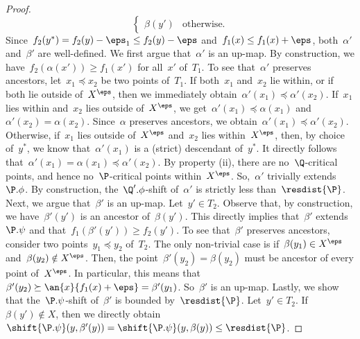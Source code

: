 \begin{proof}
\[\begin{cases}
            \beta(y') & \text{otherwise.}
        \end{cases}
    \]
    Since~$f_2(y^*) = f_2(y) - \eps_1 \le f_2(y) - \eps$ and~$f_1(x) \le f_1(x) + \eps$, both~$\alpha'$ and~$\beta'$ are well-defined.
%
%
    We first argue that~$\alpha'$ is an up-map.
    By construction, we have~$f_2(\alpha(x')) \ge f_1(x')$ for all~$x'$ of~$T_1$.
    To see that~$\alpha'$ preserves ancestors, let~$x_1 \preceq x_2$ be two points of~$T_1$.
    If both~$x_1$ and~$x_2$ lie within, or if both lie outside of~$X^\eps$, then we immediately obtain~$\alpha'(x_1) \preceq \alpha'(x_2)$.
    If~$x_1$ lies within and~$x_2$ lies outside of~$X^\eps$, we get~$\alpha'(x_1) \preceq \alpha(x_1)$ and~$\alpha'(x_2) = \alpha(x_2)$.
    Since~$\alpha$ preserves ancestors, we obtain~$\alpha'(x_1) \preceq \alpha'(x_2)$.
    Otherwise, if~$x_1$ lies outside of~$X^\eps$ and~$x_2$ lies within~$X^\eps$, then, by choice of~$y^*$, we know that~$\alpha'(x_1)$ is a (strict) descendant of~$y^*$.
    It directly follows that~$\alpha'(x_1) = \alpha(x_1) \preceq \alpha'(x_2)$.
    By property (ii), there are no~$\Q$-critical points, and hence no~$\P$-critical points within~$X^\eps$.
    So,~$\alpha'$ trivially extends~$\P.\phi$.
    By construction, the~$\Q'.\phi$-shift of~$\alpha'$ is strictly less than~$\resdist{\P}$.
%
    Next, we argue that~$\beta'$ is an up-map.
    Let~$y' \in T_2$.
    Observe that, by construction, we have~$\beta'(y')$ is an ancestor of~$\beta(y')$.
    This directly implies that~$\beta'$ extends~$\P.\psi$ and that~$f_1(\beta'(y')) \ge f_2(y')$.
    To see that~$\beta'$ preserves ancestors, consider two points~$y_1 \preceq y_2$ of~$T_2$.
    The only non-trivial case is if~$\beta(y_1) \in X^\eps$ and~$\beta(y_2) \notin X^\eps$.
    Then, the point~$\beta'(y_2) = \beta(y_2)$ must be ancestor of every point of~$X^\eps$.
    In particular, this means that~$\beta'(y_2) \succeq \an{x}{f_1(x)+\eps} = \beta'(y_1)$.
    So~$\beta'$ is an up-map.
    Lastly, we show that the~$\P.\psi$-shift of~$\beta'$ is bounded by~$\resdist{\P}$.
    Let~$y' \in T_2$.
    If~$\beta(y') \notin X$, then we directly obtain~$\shift{\P.\psi}(y, \beta'(y)) = \shift{\P.\psi}(y, \beta(y)) \le \resdist{\P}$. 

\end{proof}
